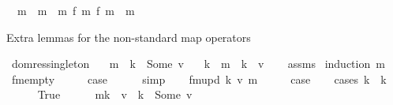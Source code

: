 \begin{isabellebody}
\isanewline
\ \ {\isachardoublequoteopen}m\ {\isasymunion}\isactrlsub {\isacharplus}{\kern0pt}\ m\ {\isasymequiv}\ {\isacharparenleft}{\kern0pt}m\ {\isasymDelta}\isactrlsub f\ m\ {\isacharplus}{\kern0pt}{\isacharplus}{\kern0pt}\isactrlsub f\ {\isacharparenleft}{\kern0pt}m\ {\isasyminter}\isactrlsub {\isacharplus}{\kern0pt}\ m%
\begin{isamarkuptext}%
Extra lemmas for the non-standard map operators%
\end{isamarkuptext}\isamarkuptrue%
\isamarkupfalse%
\ dom{\isacharunderscore}{\kern0pt}res{\isacharunderscore}{\kern0pt}singleton{\isacharcolon}{\kern0pt}\isanewline
\ \ \ {\isachardoublequoteopen}m\ {\isachardollar}{\kern0pt}{\isachardollar}{\kern0pt}\ k\ {\isacharequal}{\kern0pt}\ Some\ v{\isachardoublequoteclose}\isanewline
\ \ \ {\isachardoublequoteopen}{\isacharbraceleft}{\kern0pt}k{\isacharbraceright}{\kern0pt}\ {\isasymlhd}\ m\ {\isacharequal}{\kern0pt}\ {\isacharbraceleft}{\kern0pt}k\ {\isachardollar}{\kern0pt}{\isachardollar}{\kern0pt}{\isacharcolon}{\kern0pt}{\isacharequal}{\kern0pt}\ v{\isacharbraceright}{\kern0pt}{\isachardoublequoteclose}\isanewline
%
\isadelimproof
\ \ %
\endisadelimproof
%
\isatagproof
{}\isamarkupfalse%
\ assms\isanewline
{}\isamarkupfalse%
\ {\isacharparenleft}{\kern0pt}induction\ m{\isacharparenright}{\kern0pt}\isanewline
\ \ \isamarkupfalse%
\ fmempty\isanewline
\ \ \isamarkupfalse%
\ \isamarkupfalse%
\ {\isacharquery}{\kern0pt}case\isanewline
\ \ \ \ \isamarkupfalse%
\ simp\isanewline
{}\isamarkupfalse%
\isanewline
\ \ \isamarkupfalse%
\ {\isacharparenleft}{\kern0pt}fmupd\ k{\isacharprime}{\kern0pt}\ v{\isacharprime}{\kern0pt}\ m{\isacharparenright}{\kern0pt}\isanewline
\ \ \isamarkupfalse%
\ \isamarkupfalse%
\ {\isacharquery}{\kern0pt}case\isanewline
\ \ \isamarkupfalse%
\ {\isacharparenleft}{\kern0pt}cases\ {\isachardoublequoteopen}k\ {\isacharequal}{\kern0pt}\ k{\isacharprime}{\kern0pt}{\isachardoublequoteclose}{\isacharparenright}{\kern0pt}\isanewline
\ \ \ \ \isamarkupfalse%
\ True\isanewline
\ \ \ \ \isamarkupfalse%
\ {\isacartoucheopen}m{\isacharparenleft}{\kern0pt}k{\isacharprime}{\kern0pt}\ {\isachardollar}{\kern0pt}{\isachardollar}{\kern0pt}{\isacharcolon}{\kern0pt}{\isacharequal}{\kern0pt}\ v{\isacharprime}{\kern0pt}{\isacharparenright}{\kern0pt}\ {\isachardollar}{\kern0pt}{\isachardollar}{\kern0pt}\ k\ {\isacharequal}{\kern0pt}\ Some\ v{\isacartoucheclose}\ \isamarkupfalse%

\end{isabellebody}
